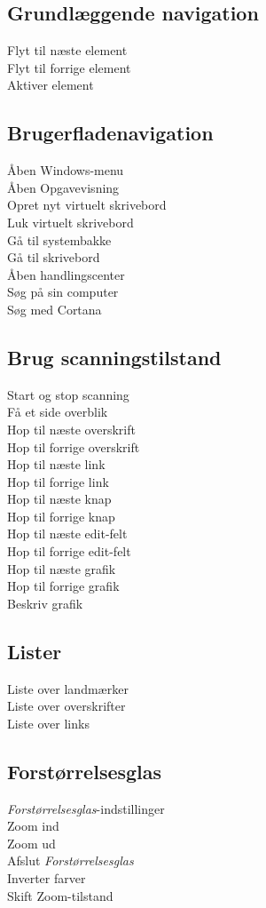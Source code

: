 \documentclass[a4paper, landscape, 11pt]{scrartcl}
\newcommand{\command}[2]{#1~\dotfill{}~#2\\} %
\begin{document}
\begin{multicols}{2}
\subsection*{Grundlæggende navigation}
\command{Flyt til næste element}{}
\command{Flyt til forrige element}{}
\command{Aktiver element}{}

\subsection*{Brugerfladenavigation}
\command{Åben Windows-menu}{\keys{\faWindows}}
\command{Åben Opgavevisning}{\keys{\faWindows + \tab}}
\command{Opret nyt virtuelt skrivebord}{\keys{\faWindows + \ctrl + d}}
\command{Luk virtuelt skrivebord}{}
\command{Gå til systembakke}{}
\command{Gå til skrivebord}{}
\command{Åben handlingscenter}{}
\command{Søg på sin computer}{}
\command{Søg med Cortana}{}

\subsection*{Brug scanningstilstand}
\command{Start og stop scanning}{}
\command{Få et side overblik}{}
\command{Hop til næste overskrift}{}
\command{Hop til forrige overskrift}{}
\command{Hop til næste link}{}
\command{Hop til forrige link}{}
\command{Hop til næste knap}{}
\command{Hop til forrige knap}{}
\command{Hop til næste edit-felt}{}
\command{Hop til forrige edit-felt}{}
\command{Hop til næste grafik}{}
\command{Hop til forrige grafik}{}
\command{Beskriv grafik}{}

\subsection*{Lister}
\command{Liste over landmærker}{}
\command{Liste over overskrifter}{}
\command{Liste over links}{}

\subsection*{Forstørrelsesglas}
\command{\emph{Forstørrelsesglas}-indstillinger}{\keys{\ctrl + \faWindows + m}}
\command{Zoom ind}{\keys{\faWindows + {+}}}
\command{Zoom ud}{\keys{\faWindows + {-}}}
\command{Afslut \emph{Forstørrelsesglas}}{\keys{\faWindows + \esc}}
\command{Inverter farver}{}
\command{Skift Zoom-tilstand}{}
\end{multicols}

\hrulefill{}
\end{document}
